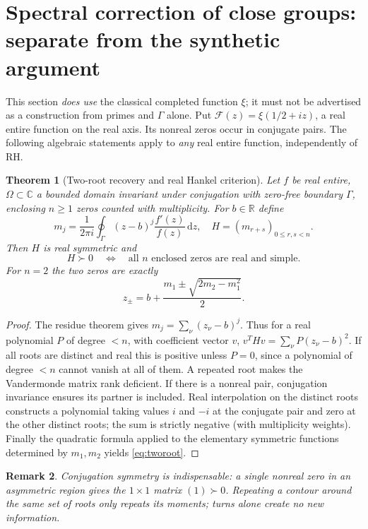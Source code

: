 \documentclass[11pt,a4paper]{article}
\numberwithin{equation}{section}
\newtheorem{theorem}{Theorem}[section]
\newtheorem{remark}[theorem]{Remark}
\newcommand{\R}{\mathbb R}
\newcommand{\C}{\mathbb C}
\newcommand{\dd}{\,\mathrm d}
\begin{document}
\section{Spectral correction of close groups: separate from the synthetic argument}
This section \emph{does use} the classical completed function $\xi$; it must not be advertised as a construction from primes and $\Gamma$ alone. Put $\mathcal F(z)=\xi(1/2+iz)$, a real entire function on the real axis. Its nonreal zeros occur in conjugate pairs. The following algebraic statements apply to \emph{any} real entire function, independently of RH.
\begin{theorem}[Two-root recovery and real Hankel criterion]\label{thm:hankel}
Let $f$ be real entire, $\Omega\subset\C$ a bounded domain invariant under conjugation with zero-free boundary $\Gamma$, enclosing $n\ge1$ zeros counted with multiplicity. For $b\in\R$ define
\begin{equation}\label{eq:moments}
m_j=\frac1{2\pi i}\oint_\Gamma(z-b)^j\frac{f'(z)}{f(z)}\dd z,
\quad H=(m_{r+s})_{0\le r,s<n}.
\end{equation}
Then $H$ is real symmetric and
\begin{equation}\label{eq:Hiff}
H\succ0\quad\Longleftrightarrow\quad
\text{all $n$ enclosed zeros are real and simple}.
\end{equation}
For $n=2$ the two zeros are exactly
\begin{equation}\label{eq:tworoot}
z_\pm=b+\frac{m_1\pm\sqrt{2m_2-m_1^2}}{2}.
\end{equation}
\end{theorem}
\begin{proof}
The residue theorem gives $m_j=\sum_\nu(z_\nu-b)^j$. Thus for a real polynomial $P$ of degree $<n$, with coefficient vector $v$, $v^THv=\sum_\nu P(z_\nu-b)^2$. If all roots are distinct and real this is positive unless $P=0$, since a polynomial of degree $<n$ cannot vanish at all of them. A repeated root makes the Vandermonde matrix rank deficient. If there is a nonreal pair, conjugation invariance ensures its partner is included. Real interpolation on the distinct roots constructs a polynomial taking values $i$ and $-i$ at the conjugate pair and zero at the other distinct roots; the sum is strictly negative (with multiplicity weights). Finally the quadratic formula applied to the elementary symmetric functions determined by $m_1,m_2$ yields \eqref{eq:tworoot}.
\end{proof}
\begin{remark}
Conjugation symmetry is indispensable: a single nonreal zero in an asymmetric region gives the $1\times1$ matrix $(1)\succ0$. Repeating a contour around the same set of roots only repeats its moments; turns alone create no new information.
\end{remark}
\end{document}

